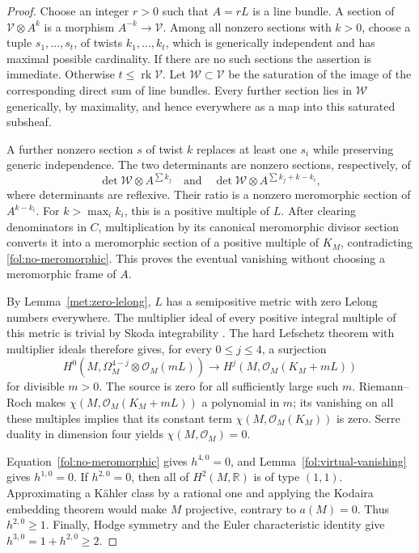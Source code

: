 \documentclass[11pt,letterpaper]{article}
\theoremstyle{definition}
\theoremstyle{remark}
\begin{document}
\begin{proof}
Choose an integer $r>0$ such that $A=rL$ is a line bundle.  A section of
$\mathcal V\otimes A^k$ is a morphism $A^{-k}\to\mathcal V$.  Among
all nonzero sections with $k>0$, choose a tuple
$s_1,\ldots,s_t$, of twists $k_1,\ldots,k_t$, which is generically
independent and has maximal possible cardinality.  If there are no such
sections the assertion is immediate.  Otherwise $t\leq\operatorname{rk}\mathcal V$.
Let $\mathcal W\subset\mathcal V$ be the saturation of the image of the
corresponding direct sum of line bundles.  Every further section lies in
$\mathcal W$ generically, by maximality, and hence everywhere as a map
into this saturated subsheaf.

A further nonzero section $s$ of twist $k$ replaces at least one $s_i$
while preserving generic independence.  The two determinants are nonzero
sections, respectively, of
\[
 \det\mathcal W\otimes A^{\sum k_j}
 \quad\text{and}\quad
 \det\mathcal W\otimes A^{\sum k_j+k-k_i},
\]
where determinants are reflexive.  Their ratio is a nonzero meromorphic
section of $A^{k-k_i}$.  For $k>\max_i k_i$, this is a positive multiple
of $L$.  After clearing denominators in $C$, multiplication by its
canonical meromorphic divisor section converts it into a meromorphic
section of a positive multiple of $K_M$, contradicting
\eqref{fol:no-meromorphic}.  This proves the eventual vanishing without
choosing a meromorphic frame of $A$.

By Lemma~\ref{met:zero-lelong}, $L$ has a semipositive metric with zero
Lelong numbers everywhere.  The multiplier ideal of every positive
integral multiple of this metric is trivial by Skoda integrability
\cite{SkodaIntegrability}.  The hard Lefschetz theorem with multiplier
ideals \cite[Theorem~0.1]{DPSHardLefschetz} therefore gives, for every
$0\leq j\leq4$, a surjection
\[
 H^0(M,\Omega_M^{4-j}\otimes\mathcal{O}_M(mL))
 \longrightarrow H^j(M,\mathcal{O}_M(K_M+mL))
\]
for divisible $m>0$.  The source is zero for all sufficiently large such
$m$.  Riemann--Roch makes $\chi(M,\mathcal{O}_M(K_M+mL))$ a polynomial in $m$;
its vanishing on all these multiples implies that its constant term
$\chi(M,\mathcal{O}_M(K_M))$ is zero.  Serre duality in dimension four yields
$\chi(M,\mathcal{O}_M)=0$.

Equation~\eqref{fol:no-meromorphic} gives $h^{4,0}=0$, and
Lemma~\ref{fol:virtual-vanishing} gives $h^{1,0}=0$.  If $h^{2,0}=0$,
then all of $H^2(M,\mathbb{R})$ is of type $(1,1)$.  Approximating a K\"ahler
class by a rational one and applying the Kodaira embedding theorem would
make $M$ projective, contrary to $a(M)=0$.  Thus $h^{2,0}\geq1$.
Finally, Hodge symmetry and the Euler characteristic identity give
$h^{3,0}=1+h^{2,0}\geq2$.
\end{proof}
\end{document}
